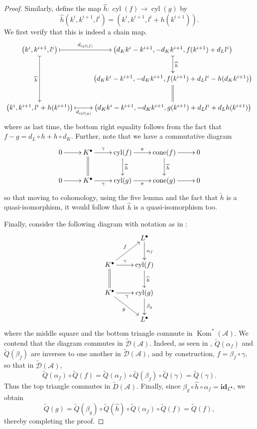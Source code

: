\documentclass[11pt]{article}
\theoremstyle{thmstyle}
\theoremstyle{defstyle}
\newcommand{\id}{\mathbf{id}}
\newcommand{\scrA}{\mathscr{A}}
\newcommand{\scrD}{\mathscr{D}}
\newcommand{\wt}[1]{\widetilde{#1}}
\newcommand{\wh}[1]{\widehat{#1}}
\newcommand{\Kom}{\operatorname{Kom}}
\newcommand{\cone}{\operatorname{cone}}
\newcommand{\cyl}{\operatorname{cyl}}
\begin{document}
\begin{proof}
	Similarly, define the map $\wh h\colon\cyl(f)\to\cyl(g)$ by 
	\begin{equation*}
		\wh h\left(k^i, k^{i + 1}, l^i\right) = \left(k^i, k^{i + 1}, l^i + h(k^{i + 1})\right).
	\end{equation*}
	We first verify that this is indeed a chain map. 
	\begin{equation*}
		\xymatrix {
			\left(k^i, k^{i + 1}, l^i\right)\ar@{|->}[r]^-{d_{\cyl(f)}}\ar@{|->}[dd]_{\wh h} & \left(d_Kk^i - k^{i + 1}, -d_Kk^{i + 1}, f(k^{i + 1}) + d_Ll^i\right)\ar@{|->}[d]^{\wh h}\\
			& \left(d_Kk^i - k^{i + 1}, -d_Kk^{i + 1}, f(k^{i + 1}) + d_Ll^i - h(d_Kk^{i + 1})\right)\ar@{=}[d]\\ 
			\left(k^i, k^{i + 1}, l^i + h(k^{i + 1})\right)\ar@{|->}[r]_-{d_{\cyl(g)}} & \left(d_Kk^i- k^{i + 1}, -d_Kk^{i + 1}, g(k^{i + 1}) + d_L l^i + d_Lh(k^{i + 1})\right)
		}
	\end{equation*}
	where as last time, the bottom right equality follows from the fact that $f - g = d_L\circ h + h\circ d_K$. Further, note that we have a commutative diagram 
	\begin{equation*}
		\xymatrix {
			0\ar[r] & K^\bullet\ar[r]^-\gamma\ar@{=}[d] & \cyl(f)\ar[r]^-\pi\ar[d]^{\wh h} & \cone(f)\ar[r]\ar[d]^{\wt h} & 0\\
			0\ar[r] & K^\bullet\ar[r]_-\gamma & \cyl(g)\ar[r]_-\pi & \cone(g)\ar[r] & 0
		}
	\end{equation*}
	so that moving to cohomology, using the five lemma and the fact that $\wt h$ is a quasi-isomorphism, it would follow that $\wh h$ is a quasi-isomorphism too.

	Finally, consider the following diagram with notation as in :
	\begin{equation*}
		\xymatrix {
			& L^\bullet\ar[d]^{\alpha_f}\\
			K^\bullet\ar[r]^-\gamma\ar@{=}[d]\ar[ru]^-f & \cyl(f)\ar[d]^{\wh h}\\
			K^\bullet\ar[r]_\gamma\ar[rd]_-g & \cyl(g)\ar[d]^{\beta_g}\\
			& L^\bullet
		}
	\end{equation*}
	where the middle square and the bottom triangle commute in $\Kom^\ast(\scrA)$. We contend that the diagram commutes in $\wt\scrD(\scrA)$. Indeed, as seen in , $\wt Q(\alpha_f)$ and $\wt Q(\beta_f)$ are inverses to one another in $\wt\scrD(\scrA)$, and by construction, $f = \beta_f\circ \gamma$, so that in $\wt\scrD(\scrA)$, 
	\begin{equation*}
		\wt Q(\alpha_f)\circ\wt Q(f) = \wt Q(\alpha_f)\circ\wt Q(\beta_f)\circ\wt Q(\gamma) = \wt Q(\gamma).
	\end{equation*}
	Thus the top triangle commutes in $\wt D(\scrA)$. Finally, since $\beta_g\circ\wh h\circ\alpha_f = \id_{L^\bullet}$, we obtain
	\begin{equation*}
		\wt Q(g) = \wt Q(\beta_g)\circ\wt Q(\wh h)\circ\wt Q(\alpha_f)\circ\wt Q(f) = \wt Q(f),
	\end{equation*}
	thereby completing the proof.
\end{proof}
\end{document}
